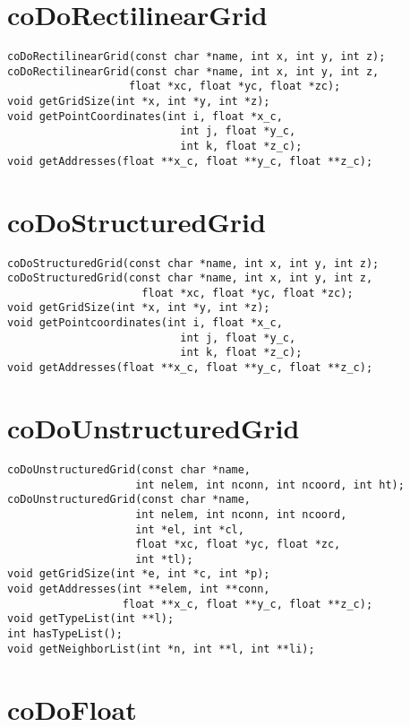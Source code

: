 \section{coDoRectilinearGrid}

\begin{verbatim} 
coDoRectilinearGrid(const char *name, int x, int y, int z);
coDoRectilinearGrid(const char *name, int x, int y, int z,
                   float *xc, float *yc, float *zc);
void getGridSize(int *x, int *y, int *z);
void getPointCoordinates(int i, float *x_c,
                           int j, float *y_c, 
                           int k, float *z_c);
void getAddresses(float **x_c, float **y_c, float **z_c);
\end{verbatim}
         

\section{coDoStructuredGrid}

\begin{verbatim} 
coDoStructuredGrid(const char *name, int x, int y, int z);
coDoStructuredGrid(const char *name, int x, int y, int z,
                     float *xc, float *yc, float *zc);
void getGridSize(int *x, int *y, int *z);
void getPointcoordinates(int i, float *x_c,
                           int j, float *y_c, 
                           int k, float *z_c);
void getAddresses(float **x_c, float **y_c, float **z_c);
\end{verbatim}
 

\section{coDoUnstructuredGrid} 

\begin{verbatim} 
coDoUnstructuredGrid(const char *name, 
                    int nelem, int nconn, int ncoord, int ht);
coDoUnstructuredGrid(const char *name, 
                    int nelem, int nconn, int ncoord, 
                    int *el, int *cl, 
                    float *xc, float *yc, float *zc, 
                    int *tl);
void getGridSize(int *e, int *c, int *p);
void getAddresses(int **elem, int **conn, 
                  float **x_c, float **y_c, float **z_c);
void getTypeList(int **l);
int hasTypeList();
void getNeighborList(int *n, int **l, int **li);
\end{verbatim}


\section{coDoFloat}
 
